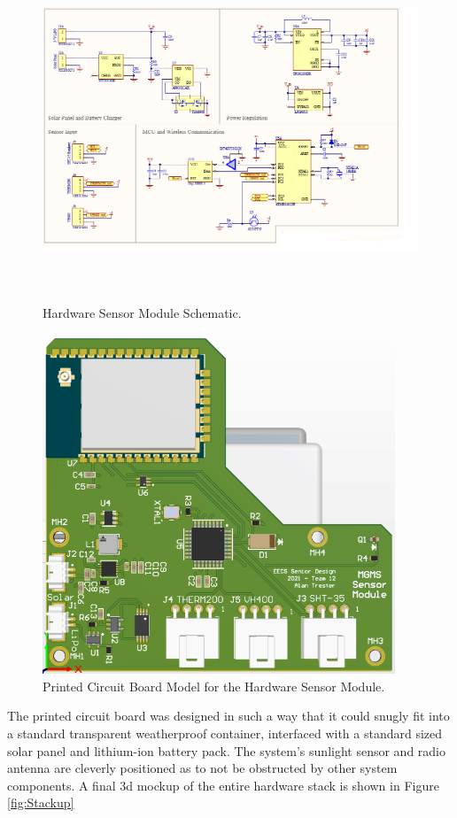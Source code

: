 \documentclass{report}
\begin{document}
\begin{figure}[H] %
    \centering
    \includegraphics[height=4in]{PNGs/Schematic.PNG}
    \caption{Hardware Sensor Module Schematic.}
    \label{fig:Schematic}
\end{figure}
\begin{figure}[H] %
    \centering
    \includegraphics[height=4in]{PNGs/PCB.PNG}
    \caption{Printed Circuit Board Model for the Hardware Sensor Module.}
    \label{fig:PCB}
\end{figure}

The printed circuit board was designed in such a way that it could snugly fit into a standard transparent weatherproof container, interfaced with a standard sized solar panel and lithium-ion battery pack. The system's sunlight sensor and radio antenna are cleverly positioned as to not be obstructed by other system components. A final 3d mockup of the entire hardware stack is shown in Figure \ref{fig:Stackup}\\
\end{document}
